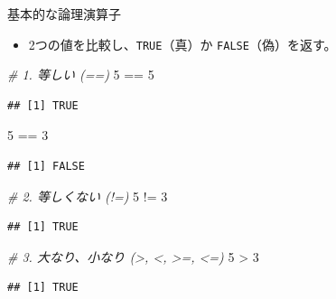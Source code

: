 \documentclass[
  ignorenonframetext,
]{beamer}
\newenvironment{Shaded}{\begin{snugshade}}{\end{snugshade}}
\newcommand{\CommentTok}[1]{\textcolor[rgb]{0.56,0.35,0.01}{\textit{#1}}}
\newcommand{\DecValTok}[1]{\textcolor[rgb]{0.00,0.00,0.81}{#1}}
\newcommand{\SpecialCharTok}[1]{\textcolor[rgb]{0.00,0.00,0.00}{#1}}
\providecommand{\tightlist}{%
  \setlength{\itemsep}{0pt}\setlength{\parskip}{0pt}}
\begin{document}
\begin{frame}[fragile]{基本的な論理演算子}
\protect\hypertarget{ux57faux672cux7684ux306aux8ad6ux7406ux6f14ux7b97ux5b50}{}
\begin{itemize}
\tightlist
\item
  2つの値を比較し、\texttt{TRUE}（真）か \texttt{FALSE}（偽）を返す。
\end{itemize}

\scriptsize

\begin{Shaded}
\begin{Highlighting}[]
\CommentTok{\# 1. 等しい (==)}
\DecValTok{5} \SpecialCharTok{==} \DecValTok{5}
\end{Highlighting}
\end{Shaded}

\begin{verbatim}
## [1] TRUE
\end{verbatim}

\begin{Shaded}
\begin{Highlighting}[]
\DecValTok{5} \SpecialCharTok{==} \DecValTok{3}
\end{Highlighting}
\end{Shaded}

\begin{verbatim}
## [1] FALSE
\end{verbatim}

\begin{Shaded}
\begin{Highlighting}[]
\CommentTok{\# 2. 等しくない (!=)}
\DecValTok{5} \SpecialCharTok{!=} \DecValTok{3}
\end{Highlighting}
\end{Shaded}

\begin{verbatim}
## [1] TRUE
\end{verbatim}

\begin{Shaded}
\begin{Highlighting}[]
\CommentTok{\# 3. 大なり、小なり (\textgreater{}, \textless{}, \textgreater{}=, \textless{}=)}
\DecValTok{5} \SpecialCharTok{\textgreater{}} \DecValTok{3}
\end{Highlighting}
\end{Shaded}

\begin{verbatim}
## [1] TRUE
\end{verbatim}

\normalsize
\end{frame}
\end{document}
